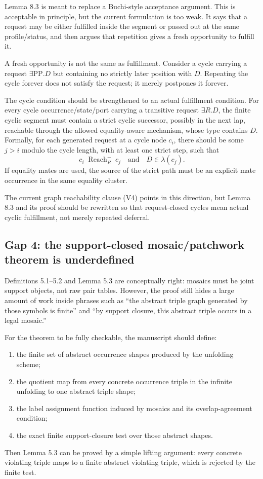 \documentclass[11pt]{article}
\newcommand{\PP}{\mathrm{PP}}
\newcommand{\Reach}{\operatorname{Reach}}
\begin{document}
Lemma 8.3 is meant to replace a Buchi-style acceptance argument.  This is acceptable in principle, but the current formulation is too weak.  It says that a request may be either fulfilled inside the segment or passed out at the same profile/status, and then argues that repetition gives a fresh opportunity to fulfill it.

A fresh opportunity is not the same as fulfillment.  Consider a cycle carrying a request \(\exists\PP.D\) but containing no strictly later position with \(D\).  Repeating the cycle forever does not satisfy the request; it merely postpones it forever.

The cycle condition should be strengthened to an actual fulfillment condition.  For every cycle occurrence/state/port carrying a transitive request \(\exists R.D\), the finite cyclic segment must contain a strict cyclic successor, possibly in the next lap, reachable through the allowed equality-aware mechanism, whose type contains \(D\).  Formally, for each generated request at a cycle node \(c_i\), there should be some \(j>i\) modulo the cycle length, with at least one strict step, such that
\[
 c_i\;\Reach_R^{+}\;c_j
 \quad\text{and}\quad
 D\in\lambda(c_j).
\]
If equality mates are used, the source of the strict path must be an explicit mate occurrence in the same equality cluster.

The current graph reachability clause (V4) points in this direction, but Lemma 8.3 and its proof should be rewritten so that request-closed cycles mean actual cyclic fulfillment, not merely repeated deferral.

\subsection{Gap 4: the support-closed mosaic/patchwork theorem is underdefined}

Definitions 5.1--5.2 and Lemma 5.3 are conceptually right: mosaics must be joint support objects, not raw pair tables.  However, the proof still hides a large amount of work inside phrases such as ``the abstract triple graph generated by those symbols is finite'' and ``by support closure, this abstract triple occurs in a legal mosaic.''

For the theorem to be fully checkable, the manuscript should define:
\begin{enumerate}[label=(\alph*),leftmargin=*]
\item the finite set of abstract occurrence shapes produced by the unfolding scheme;
\item the quotient map from every concrete occurrence triple in the infinite unfolding to one abstract triple shape;
\item the label assignment function induced by mosaics and its overlap-agreement condition;
\item the exact finite support-closure test over those abstract shapes.
\end{enumerate}
Then Lemma 5.3 can be proved by a simple lifting argument: every concrete violating triple maps to a finite abstract violating triple, which is rejected by the finite test.
\end{document}

